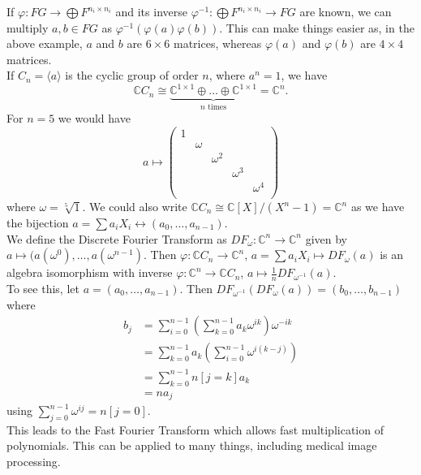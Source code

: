 \documentclass[12pt]{amsart}
\theoremstyle{definition}
\begin{document}
If $\varphi:FG\rightarrow\bigoplus F^{n_i\times n_i}$ and its inverse $\varphi^{-1}:\bigoplus F^{n_i\times n_i}\rightarrow FG$ are known, we can multiply $a, b\in FG$ as $\varphi^{-1}(\varphi(a)\varphi(b))$.  This can make things easier as, in the above example, $a$ and $b$ are $6\times 6$ matrices, whereas $\varphi(a)$ and $\varphi(b)$ are $4\times 4$ matrices.\\

If $C_n=\langle a\rangle$ is the cyclic group of order $n$, where $a^n=1$, we have
$$\mathbb{C}C_n\cong\underbrace{\mathbb{C}^{1\times 1}\oplus\ldots\oplus\mathbb{C}^{1\times 1}}_{n\textrm{ times}}=\mathbb{C}^n.$$
For $n=5$ we would have
$$a\mapsto\left( \begin{array}{ccccc} 1 & & & & \\ & \omega & & & \\ & & \omega^2 & & \\ & & & \omega^3 & \\ & & & & \omega^4 \\\end{array}\right)$$
where $\omega=\sqrt[5]{1}$.  We could also write $\mathbb{C}C_n\cong\mathbb{C}[X]/(X^n-1)=\mathbb{C}^n$ as we have the bijection $a=\sum a_iX_i\leftrightarrow (a_0,\ldots,a_{n-1})$.\\
We define the Discrete Fourier Transform as $DF_{\omega}:\mathbb{C}^n\rightarrow\mathbb{C}^n$ given by $a\mapsto (a(\omega^0),\ldots,a(\omega^{n-1})$.  Then $\varphi:\mathbb{C}C_n\rightarrow\mathbb{C}^n$, $a=\sum a_iX_i\mapsto DF_{\omega}(a)$ is an algebra isomorphism with inverse $\varphi:\mathbb{C}^n\rightarrow\mathbb{C}C_n$, $a\mapsto\frac{1}{n}DF_{\omega^{-1}}(a).$\\
To see this, let $a=(a_0,\ldots,a_{n-1})$.  Then $DF_{\omega^{-1}}(DF_{\omega}(a))=(b_0,\ldots,b_{n-1})$ where
\begin{equation*}
\begin{split}
b_j &= \sum_{i=0}^{n-1}(\sum_{k=0}^{n-1}a_k\omega^{ik})\omega^{-ik}\\
&= \sum_{k=0}^{n-1}a_k(\sum_{i=0}^{n-1}\omega^{i(k-j)})\\
&= \sum_{k=0}^{n-1}n[j=k]a_k\\
&= na_j
\end{split}
\end{equation*}
using $\sum_{j=0}^{n-1}\omega^{ij}=n[j=0]$.\\
This leads to the Fast Fourier Transform which allows fast multiplication of polynomials.  This can be applied to many things, including medical image processing.

\nocite{*}




\end{document}
